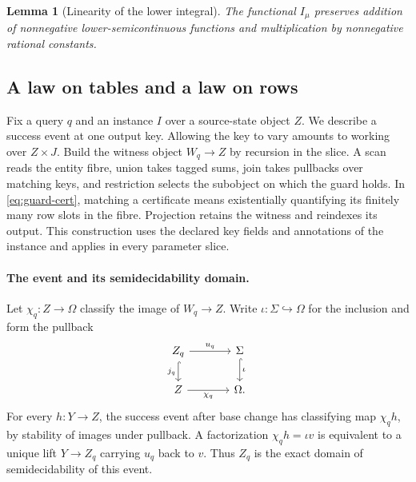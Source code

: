 \documentclass[11pt,a4paper]{article}
\newtheorem{lemma}[lemma]{Lemma}
\theoremstyle{definition}
\theoremstyle{remark}\newaliascnt{remark}{theorem}
\numberwithin{equation}{section}
\begin{document}
\begin{lemma}[Linearity of the lower integral]\label{lem:eff-linearity}
The functional \(I_\mu\) preserves addition of nonnegative lower-semicontinuous functions and multiplication by nonnegative rational constants.
\end{lemma}

\subsection{A law on tables and a law on rows}

Fix a query $q$ and an instance $I$ over a source-state object $Z$. We describe a success event at one output key. Allowing the key to vary amounts to working over $Z\times J$. Build the witness object $W_q\to Z$ by recursion in the slice. A scan reads the entity fibre, union takes tagged sums, join takes pullbacks over matching keys, and restriction selects the subobject on which the guard holds. In \eqref{eq:guard-cert}, matching a certificate means existentially quantifying its finitely many row slots in the fibre. Projection retains the witness and reindexes its output. This construction uses the declared key fields and annotations of the instance and applies in every parameter slice.

\paragraph{The event and its semidecidability domain.}
Let $\chi_q:Z\to\Omega$ classify the image of $W_q\to Z$. Write $\iota:\Sigma\hookrightarrow\Omega$ for the inclusion and form the pullback
\begin{equation}\label{eq:query-test-domain}
\begin{tikzcd}[column sep=large]
 Z_q\arrow[r,"u_q"]\arrow[d,hook,"j_q"'] & \Sigma\arrow[d,hook,"\iota"]\\
 Z\arrow[r,"\chi_q"'] & \Omega .
\end{tikzcd}
\end{equation}
For every $h:Y\to Z$, the success event after base change has classifying map $\chi_q h$, by stability of images under pullback. A factorization $\chi_q h=\iota v$ is equivalent to a unique lift $Y\to Z_q$ carrying $u_q$ back to $v$. Thus $Z_q$ is the exact domain of semidecidability of this event.
\end{document}
